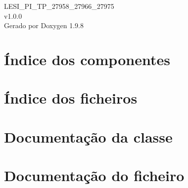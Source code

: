 \documentclass[twoside]{book}
\newcommand{\+}{\discretionary{\mbox{\scriptsize$\hookleftarrow$}}{}{}}
\newcommand{\clearemptydoublepage}{%
    \newpage{\pagestyle{empty}\cleardoublepage}%
  }
\begin{document}
  \raggedbottom
    \hypersetup{pageanchor=false,
                bookmarksnumbered=true,
                pdfencoding=unicode
               }
  \begin{titlepage}
  \vspace*{7cm}
  \begin{center}%
  {\Large LESI\+\_\+\+PI\+\_\+\+TP\+\_\+27958\+\_\+27966\+\_\+27975}\\
  [1ex]\large v1.\+0.\+0 \\
  \vspace*{1cm}
  {\large Gerado por Doxygen 1.9.8}\\
  \end{center}
  \end{titlepage}
  \clearemptydoublepage
  \tableofcontents
  \clearemptydoublepage
  \hypersetup{pageanchor=true}
\chapter{Índice dos componentes}

\chapter{Índice dos ficheiros}

\chapter{Documentação da classe}






\chapter{Documentação do ficheiro}










  \backmatter
  \newpage
  \clearemptydoublepage
  \printindex
\end{document}
